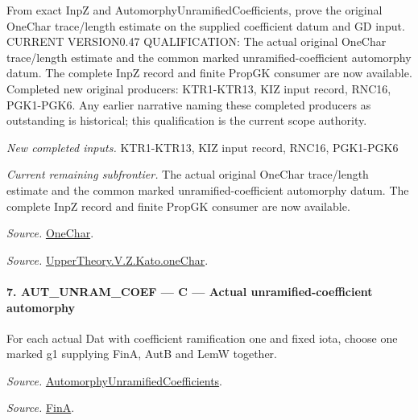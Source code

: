 \documentclass[11pt,a4paper]{article}
\numberwithin{equation}{section}
\theoremstyle{remark}\newtheorem{remark}[theorem]{Remark}
\begin{document}
From exact InpZ and AutomorphyUnramifiedCoefficients, prove the original OneChar trace/length estimate on the supplied coefficient datum and GD input. CURRENT VERSION0.47 QUALIFICATION: The actual original OneChar trace/length estimate and the common marked unramified-coefficient automorphy datum. The complete InpZ record and finite PropGK consumer are now available. Completed new original producers: KTR1-KTR13, KIZ input record, RNC16, PGK1-PGK6. Any earlier narrative naming these completed producers as outstanding is historical; this qualification is the current scope authority.

\emph{New completed inputs.} KTR1-KTR13, KIZ input record, RNC16, PGK1-PGK6

\emph{Current remaining subfrontier.} The actual original OneChar trace/length estimate and the common marked unramified-coefficient automorphy datum. The complete InpZ record and finite PropGK consumer are now available.

\emph{Source.} \href{https://github.com/CocoSgt/riemann-hypothesis-lean/blob/7cbf7a0c32fca1badf05931879a37c3f8a2b03b4/src/Development/AutomorphicArithmetic/AutomorphicVarieties/UnitaryThreeGroups/KatoUse.lean#L54-L64}{OneChar}.

\emph{Source.} \href{https://github.com/CocoSgt/riemann-hypothesis-lean/blob/7cbf7a0c32fca1badf05931879a37c3f8a2b03b4/src/Development/AutomorphicArithmetic/AutomorphicVarieties/ModularityArgument/KatoQuadraticCharacters/OneChar.lean#L158-L178}{UpperTheory.V.Z.Kato.oneChar}.



\paragraph{7. AUT\_\allowbreak UNRAM\_\allowbreak COEF — C — Actual unramified-coefficient automorphy}

For each actual Dat with coefficient ramification one and fixed iota, choose one marked g1 supplying FinA, AutB and LemW together.

\emph{Source.} \href{https://github.com/CocoSgt/riemann-hypothesis-lean/blob/7cbf7a0c32fca1badf05931879a37c3f8a2b03b4/src/Development/AutomorphicArithmetic/AutomorphicVarieties/AutomorphicCases/AutomorphyUnramifiedCoefficients.lean#L24-L27}{AutomorphyUnramifiedCoefficients}.

\emph{Source.} \href{https://github.com/CocoSgt/riemann-hypothesis-lean/blob/7cbf7a0c32fca1badf05931879a37c3f8a2b03b4/src/Development/AutomorphicArithmetic/AutomorphicVarieties/AutomorphicCases/AutomorphyUnramifiedCoefficients.lean#L12-L13}{FinA}.
\end{document}
